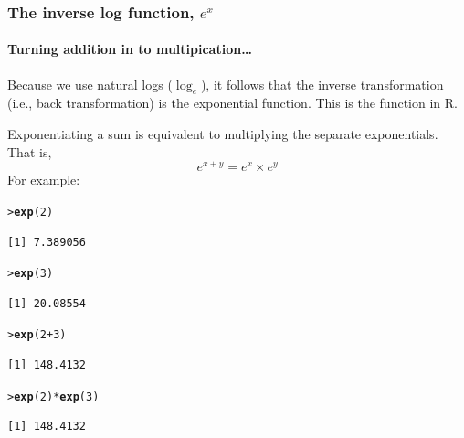 \documentclass{beamer}\usepackage[]{graphicx}\usepackage[]{xcolor}
\makeatletter
\newcommand{\hlnum}[1]{\textcolor[rgb]{0.686,0.059,0.569}{#1}}%
\newcommand{\hlopt}[1]{\textcolor[rgb]{0,0,0}{#1}}%
\newcommand{\hlstd}[1]{\textcolor[rgb]{0.345,0.345,0.345}{#1}}%
\newcommand{\hlkwd}[1]{\textcolor[rgb]{0.737,0.353,0.396}{\textbf{#1}}}%
\newenvironment{kframe}{%
 \def\at@end@of@kframe{}%
 \ifinner\ifhmode%
  \def\at@end@of@kframe{\end{minipage}}%
  \begin{minipage}{\columnwidth}%
 \fi\fi%
 \def\FrameCommand##1{\hskip\@totalleftmargin \hskip-\fboxsep
 \colorbox{shadecolor}{##1}\hskip-\fboxsep
     \hskip-\linewidth \hskip-\@totalleftmargin \hskip\columnwidth}%
 \MakeFramed {\advance\hsize-\width
   \@totalleftmargin\z@ \linewidth\hsize
   \@setminipage}}%
 {\par\unskip\endMakeFramed%
 \at@end@of@kframe}
\newenvironment{knitrout}{}{} %
\makeatother
\begin{document}
\begin{frame}[fragile]
\frametitle{The inverse log function, $e^x$}
\framesubtitle{Turning addition in to multipication\ldots}

Because we use natural logs ($\log_e$), it follows that the inverse transformation (i.e., back transformation) is the exponential function. This is the  function in {\rcode R}. 
\medskip

Exponentiating a sum is equivalent to multiplying the separate exponentials. 
That is,
\[ e^{x+y} = e^x \times e^y \]
For example:

\begin{knitrout}\scriptsize
{}\color{fgcolor}\begin{kframe}
\begin{alltt}
\hlstd{> }\hlkwd{exp}\hlstd{(}\hlnum{2}\hlstd{)}
\end{alltt}
\begin{verbatim}
[1] 7.389056
\end{verbatim}
\begin{alltt}
\hlstd{> }\hlkwd{exp}\hlstd{(}\hlnum{3}\hlstd{)}
\end{alltt}
\begin{verbatim}
[1] 20.08554
\end{verbatim}
\begin{alltt}
\hlstd{> }\hlkwd{exp}\hlstd{(}\hlnum{2}\hlopt{+}\hlnum{3}\hlstd{)}
\end{alltt}
\begin{verbatim}
[1] 148.4132
\end{verbatim}
\begin{alltt}
\hlstd{> }\hlkwd{exp}\hlstd{(}\hlnum{2}\hlstd{)}\hlopt{*}\hlkwd{exp}\hlstd{(}\hlnum{3}\hlstd{)}
\end{alltt}
\begin{verbatim}
[1] 148.4132
\end{verbatim}
\end{kframe}
\end{knitrout}
\end{frame}


\end{document}
